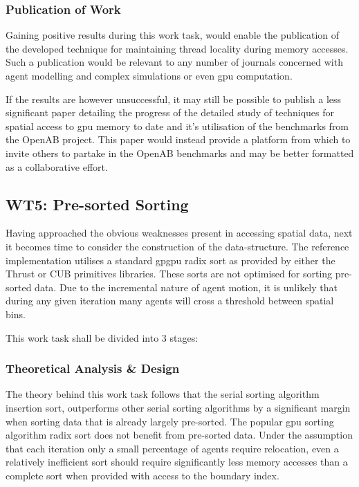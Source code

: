       \subsubsection*{Publication of Work}
        Gaining positive results during this work task, would enable the publication of the developed technique for maintaining thread locality during memory accesses. Such a publication would be relevant to any number of journals concerned with agent modelling and complex simulations or even \gls{gpu} computation.
        
        If the results are however unsuccessful, it may still be possible to publish a less significant paper detailing the progress of the detailed study of techniques for spatial access to \gls{gpu} memory to date and it's utilisation of the benchmarks from the OpenAB project. This paper would instead provide a platform from which to invite others to partake in the OpenAB benchmarks and may be better formatted as a collaborative effort.
      
        
    \subsection{WT5: Pre-sorted Sorting}
      Having approached the obvious weaknesses present in accessing spatial data, next it becomes time to consider the construction of the data-structure. The reference implementation utilises a standard \gls{gpgpu} radix sort as provided by either the Thrust or CUB primitives libraries. These sorts are not optimised for sorting pre-sorted data. Due to the incremental nature of agent motion, it is unlikely that during any given iteration many agents will cross a threshold between spatial bins.
           
      This work task shall be divided into 3 stages:
      \subsubsection*{Theoretical Analysis \& Design}
        The theory behind this work task follows that the serial sorting algorithm insertion sort, outperforms other serial sorting algorithms by a significant margin when sorting data that is already largely pre-sorted. The popular \gls{gpu} sorting algorithm radix sort does not benefit from pre-sorted data. Under the assumption that each iteration only a small percentage of agents require relocation, even a relatively inefficient sort should require significantly less memory accesses than a complete sort when provided with access to the boundary index.
        
